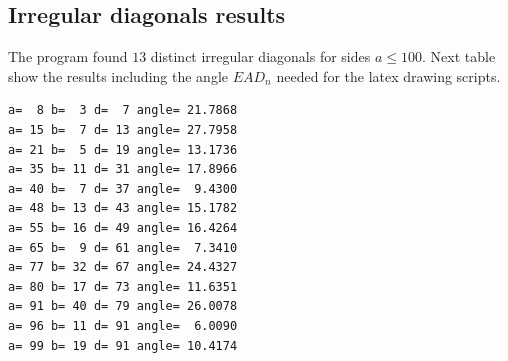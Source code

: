 \documentclass[11pt]{article}
\begin{document}
\subsection{Irregular diagonals results}
The program found $13$ distinct irregular diagonals for sides $a \leq 100$.
Next table show the results including the angle $EAD_n$ needed for the latex drawing scripts.
\begin{lstlisting}
a=  8 b=  3 d=  7 angle= 21.7868
a= 15 b=  7 d= 13 angle= 27.7958
a= 21 b=  5 d= 19 angle= 13.1736
a= 35 b= 11 d= 31 angle= 17.8966
a= 40 b=  7 d= 37 angle=  9.4300
a= 48 b= 13 d= 43 angle= 15.1782
a= 55 b= 16 d= 49 angle= 16.4264
a= 65 b=  9 d= 61 angle=  7.3410
a= 77 b= 32 d= 67 angle= 24.4327
a= 80 b= 17 d= 73 angle= 11.6351
a= 91 b= 40 d= 79 angle= 26.0078
a= 96 b= 11 d= 91 angle=  6.0090
a= 99 b= 19 d= 91 angle= 10.4174
\end{lstlisting}

\newcommand{\resultA}[5]{ %
 \begin{tikzpicture}
  \def\r{21.7868}
  \begin{scope} %
   \meccanostrip[0000FF]{#1}{#3}{#4}
   \path (0,0) ++(240:5*#4) node{A};
   \begin{scope}[shift={(#5*#3,0)},rotate=\r] %
    \meccanostrip[FF6600]{#2}{#3}{#4}
    \path (#2*#3,0) ++(-45:5*#4) node{G};
   \end{scope}
   \begin{scope}[shift={(#1*#3,0)},rotate=60] %
    \meccanostrip[0000FF]{#1}{#3}{#4}
    \path (0,0) ++(240:5*#4) node{B};
   \begin{scope}[shift={(#5*#3,0)},rotate=\r] %
    \meccanostrip[FF6600]{#2}{#3}{#4}
    \path (#2*#3,0) ++(-60:5*#4) node{H};
   \end{scope}
  \begin{scope}[shift={(#1*#3,0)},rotate=60] %
   \meccanostrip[0000FF]{#1}{#3}{#4}
   \path (0,0) ++(240:5*#4) node{C};
   \begin{scope}[shift={(#5*#3,0)},rotate=\r] %
    \meccanostrip[FF6600]{#2}{#3}{#4}
    \path (#2*#3,0) ++(-60:5*#4) node{I};
   \end{scope}
   \begin{scope}[shift={(#1*#3,0)},rotate=60] %
    \meccanostrip[0000FF]{#1}{#3}{#4}
    \path (0,0) ++(240:5*#4) node{D};
     \begin{scope}[shift={(#1*#3,0)},rotate=60]
      \meccanostrip[0000FF]{#1}{#3}{#4}
      \path (0,0) ++(240:5*#4) node{E};
      \begin{scope}[shift={(#1*#3,0)},rotate=60] %
       \meccanostrip[0000FF]{#1}{#3}{#4}
       \path (0,0) ++(240:5*#4) node{F};
      \end{scope}
     \end{scope}
    \end{scope}   
   \end{scope}
  \end{scope}
 \end{scope}
\end{tikzpicture}
}
\end{document}
